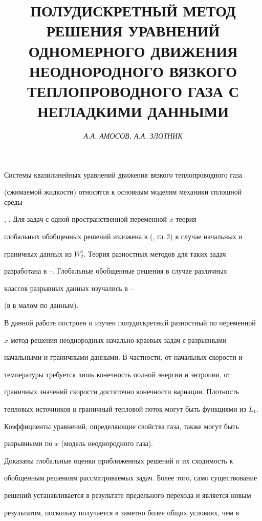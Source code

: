 \documentclass[12pt]{article}
\author{\it А.А. АМОСОВ, А.А. ЗЛОТНИК}
\title{ПОЛУДИСКРЕТНЫЙ МЕТОД РЕШЕНИЯ УРАВНЕНИЙ\\


ОДНОМЕРНОГО ДВИЖЕНИЯ НЕОДНОРОДНОГО ВЯЗКОГО\\


ТЕПЛОПРОВОДНОГО ГАЗА С НЕГЛАДКИМИ ДАННЫМИ}
\date{}
\theoremstyle{plain} %
\theoremstyle{definition}
\numberwithin{equation}{section}
\begin{document}
\maketitle





Системы квазилинейных уравнений движения вязкого теплопроводного газа


(сжимаемой жидкости) относятся к основным моделям механики сплошной среды


\cite{Ro}, \cite{Ant}. Для задач с одной пространственной переменной $x$ теория


глобальных обобщенных решений изложена в (\cite{Ant}, гл.\,2) в случае начальных и


граничных данных из $W_2^1$. Теория разностных методов для таких задач


разработана в \cite{Amo1}--\cite{Amo4}. Глобальные обобщенные решения в случае различных


классов разрывных данных изучались в \cite{She}--\cite{Hoff}


(в \cite{Hoff} в малом по данным).





В данной работе построен и изучен полудискретный разностный по переменной


$x$ метод решения неоднородных начально-краевых задач с разрывными


начальными и граничными данными. В частности, от начальных скорости и


температуры требуется лишь конечность полной энергии и энтропии, от


граничных значений скорости достаточно конечности вариации. Плотность


тепловых источников и граничный тепловой поток могут быть функциями из $L_1$.


Коэффициенты уравнений, определяющие свойства газа, также могут быть


разрывными по $x$ (модель неоднородного газа).





Доказаны глобальные оценки приближенных решений и их сходимость к


обобщенным решениям рассматриваемых задач. Более того, само существование


решений устанавливается в результате предельного перехода и является новым


результатом, поскольку получается в заметно более общих условиях, чем в
\end{document}
